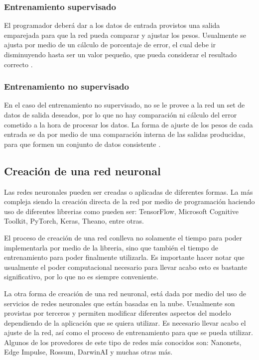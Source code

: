 \subsubsection{Entrenamiento supervisado}
El programador deberá dar a los datos de entrada provistos una salida emparejada para que la red pueda comparar y ajustar los pesos. Usualmente se ajusta por medio de un cálculo de porcentaje de error, el cual debe ir disminuyendo hasta ser un valor pequeño, que pueda considerar el resultado correcto \cite{olabe_2008}.
\subsubsection{Entrenamiento no supervisado}
En el caso del entrenamiento no supervisado, no se le provee a la red un set de datos de salida deseados, por lo que no hay comparación ni cálculo del error cometido a la hora de procesar los datos. La forma de ajuste de los pesos de cada entrada se da por medio de una comparación interna de las salidas producidas, para que formen un conjunto de datos consistente \cite{olabe_2008}. 
\subsection{Creación de una red neuronal}
Las redes neuronales pueden ser creadas o aplicadas de diferentes formas. La más compleja siendo la creación directa de la red por medio de programación haciendo uso de diferentes librerias como pueden ser: TensorFlow, Microsoft Cognitive Toolkit, PyTorch, Keras, Theano, entre otras. 
\par
El proceso de creación de una red conlleva no solamente el tiempo para poder implementarla por medio de la libreria, sino que también el tiempo de entrenamiento para poder finalmente utilizarla. Es importante hacer notar que usualmente el poder computacional necesario para llevar acabo esto es bastante significativo, por lo que no es siempre conveniente.
\par
La otra forma de creación de una red neuronal, está dada por medio del uso de servicios de redes neuronales que están basadas en la nube. Usualmente son provistas por terceros y permiten modificar diferentes aspectos del modelo dependiendo de la aplicación que se quiera utilizar. Es necesario llevar acabo el ajuste de la red, así como el proceso de entrenamiento para que se pueda utilizar. Algunos de los provedores de este tipo de redes más conocidos son: Nanonets, Edge Impulse, Rossum, DarwinAI y muchas otras más.

